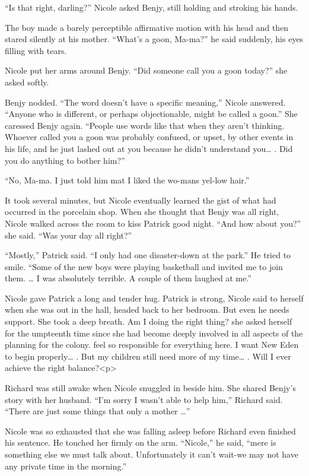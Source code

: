 \documentclass[]{article}
\begin{document}
{“Is that right, darling?” Nicole asked Benjy, still holding and stroking his hands.

The boy made a barely perceptible affirmative motion with his head and then stared silently at his mother. “What’s a goon, Ma-ma?” he said suddenly, his eyes filling with tears.

Nicole put her arms around Benjy. “Did someone call you a goon today?” she asked softly.

Benjy nodded. “The word doesn’t have a specific meaning,” Nicole answered. “Anyone who is different, or perhaps objectionable, might be called a goon.” She caressed Benjy again. “People use words like that when they aren’t thinking. Whoever called you a goon was probably confused, or upset, by other events in his life, and he just lashed out at you because he didn’t understand you… . Did you do anything to bother him?”

“No, Ma-ma. I just told him mat I liked the wo-mans yel-low hair.”

It took several minutes, but Nicole eventually learned the gist of what had occurred in the porcelain shop. When she thought that Benjy was all right, Nicole walked across the room to kiss Patrick good night. “And how about you?” she said. “Was your day all right?”

“Mostly,” Patrick said. “I only had one disaster-down at the park.” He tried to smile. “Some of the new boys were playing basketball and invited me to join them. … I was absolutely terrible. A couple of them laughed at me.”

Nicole gave Patrick a long and tender hug. Patrick is strong, Nicole said to herself when she was out in the hall, headed back to her bedroom. But even he needs support. She took a deep breath. Am I doing the right thing? she asked herself for the umpteenth time since she had become deeply involved in all aspects of the planning for the colony. feel so responsible for everything here. I want New Eden to begin properly… . But my children still need more of my time… . Will I ever achieve the right balance?<p>

Richard was still awake when Nicole snuggled in beside him. She shared Benjy’s story with her husband. “I’m sorry I wasn’t able to help him,” Richard said. “There are just some things that only a mother …”

Nicole was so exhausted that she was falling asleep before Richard even finished his sentence. He touched her firmly on the arm. “Nicole,” he said, “mere is something else we must talk about. Unfortunately it can’t wait-we may not have any private time in the morning.”

}
\end{document}
